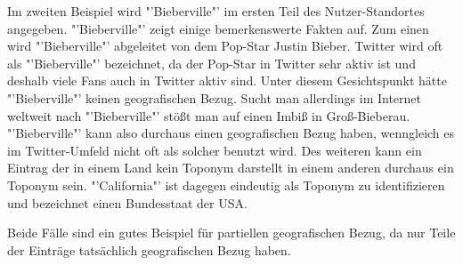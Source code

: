 						Im zweiten Beispiel wird "'Bieberville"' im ersten Teil des Nutzer-Standortes angegeben. 
						"'Bieberville"' zeigt einige bemerkenswerte Fakten auf.
						Zum einen wird "'Bieberville"' abgeleitet von dem Pop-Star Justin Bieber.	
						Twitter wird oft als "'Bieberville"' bezeichnet, da der Pop-Star in Twitter sehr aktiv ist und deshalb viele Fans auch in Twitter aktiv sind.
						Unter diesem Gesichtspunkt hätte "'Bieberville"' keinen geografischen Bezug.
						Sucht man allerdings im Internet weltweit nach "'Bieberville"' stößt man auf einen Imbiß in Groß-Bieberau.
						"'Bieberville"' kann also durchaus einen geografischen Bezug haben, wenngleich es im Twitter-Umfeld nicht oft als solcher benutzt wird. 
						Des weiteren kann ein Eintrag der in einem Land kein Toponym darstellt in einem anderen durchaus ein Toponym sein.
 						"'California"' ist dagegen eindeutig als Toponym zu identifizieren und bezeichnet einen Bundesstaat der USA.

						Beide Fälle sind ein gutes Beispiel für partiellen geografischen Bezug, da nur Teile der Einträge tatsächlich geografischen Bezug haben. 

